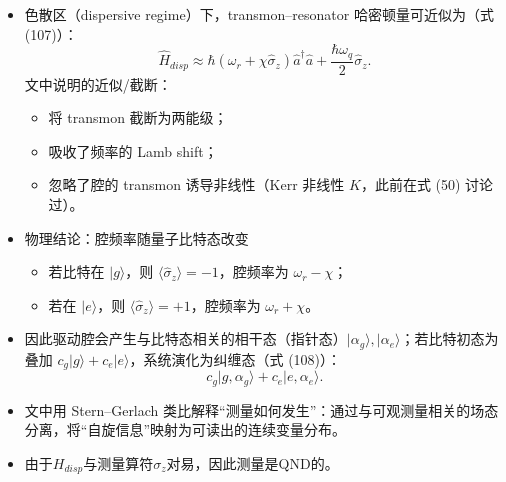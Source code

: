 \documentclass[12pt,a4paper,oneside]{ctexbook}
\providecommand{\tightlist}{%
  \setlength{\itemsep}{0pt}\setlength{\parskip}{0pt}}
\begin{document}
\begin{itemize}
\tightlist
\item
  色散区（dispersive regime）下，transmon--resonator
  哈密顿量可近似为（式 (107)）： \[
  \hat{H}_{disp}\approx \hbar(\omega_r+\chi\hat{\sigma}_z)\hat{a}^\dagger\hat{a}
  +\frac{\hbar\omega_q}{2}\hat{\sigma}_z .
  \] 文中说明的近似/截断：

  \begin{itemize}
  \tightlist
  \item
    将 transmon 截断为两能级；
  \item
    吸收了频率的 Lamb shift；
  \item
    忽略了腔的 transmon 诱导非线性（Kerr 非线性 \(K\)，此前在式 (50)
    讨论过）。
  \end{itemize}
\item
  物理结论：腔频率随量子比特态改变

  \begin{itemize}
  \tightlist
  \item
    若比特在 \(\lvert g\rangle\)，则
    \(\langle \hat{\sigma}_z\rangle=-1\)，腔频率为 \(\omega_r-\chi\)；
  \item
    若在 \(\lvert e\rangle\)，则
    \(\langle \hat{\sigma}_z\rangle=+1\)，腔频率为 \(\omega_r+\chi\)。
  \end{itemize}
\item
  因此驱动腔会产生与比特态相关的相干态（指针态）\(\lvert \alpha_g\rangle,\lvert\alpha_e\rangle\)；若比特初态为叠加
  \(c_g\lvert g\rangle+c_e\lvert e\rangle\)，系统演化为纠缠态（式
  (108)）： \[
  c_g\lvert g,\alpha_g\rangle+c_e\lvert e,\alpha_e\rangle .
  \]
\item
  文中用 Stern--Gerlach
  类比解释``测量如何发生''：通过与可观测量相关的场态分离，将``自旋信息''映射为可读出的连续变量分布。
\item 由于$H_{disp}$与测量算符$\sigma_z$对易，因此测量是QND的。
\end{itemize}
\end{document}
